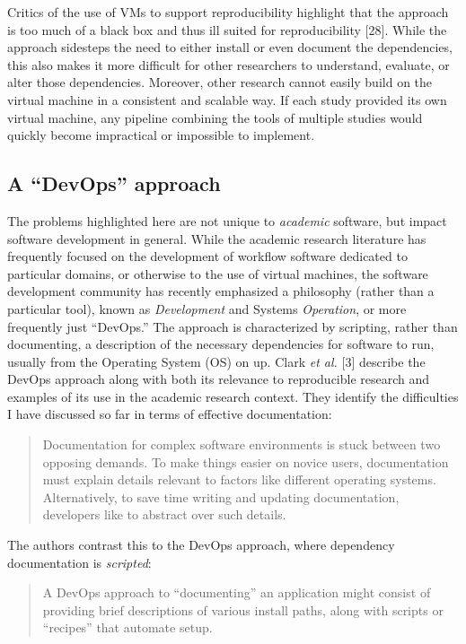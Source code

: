 \documentclass[9pt]{components/acm_proc_article-sp}
\begin{document}
Critics of the use of VMs to support reproducibility highlight that the
approach is too much of a black box and thus ill suited for
reproducibility {[}28{]}. While the approach sidesteps the need to
either install or even document the dependencies, this also makes it
more difficult for other researchers to understand, evaluate, or alter
those dependencies. Moreover, other research cannot easily build on the
virtual machine in a consistent and scalable way. If each study provided
its own virtual machine, any pipeline combining the tools of multiple
studies would quickly become impractical or impossible to implement.

\subsection{A ``DevOps'' approach}\label{a-devops-approach}

The problems highlighted here are not unique to \emph{academic}
software, but impact software development in general. While the academic
research literature has frequently focused on the development of
workflow software dedicated to particular domains, or otherwise to the
use of virtual machines, the software development community has recently
emphasized a philosophy (rather than a particular tool), known as
\emph{Development} and Systems \emph{Operation}, or more frequently just
``DevOps.'' The approach is characterized by scripting, rather than
documenting, a description of the necessary dependencies for software to
run, usually from the Operating System (OS) on up. Clark \emph{et al.}
{[}3{]} describe the DevOps approach along with both its relevance to
reproducible research and examples of its use in the academic research
context. They identify the difficulties I have discussed so far in terms
of effective documentation:

\begin{quote}
Documentation for complex software environments is stuck between two
opposing demands. To make things easier on novice users, documentation
must explain details relevant to factors like different operating
systems. Alternatively, to save time writing and updating documentation,
developers like to abstract over such details.
\end{quote}

The authors contrast this to the DevOps approach, where dependency
documentation is \emph{scripted}:

\begin{quote}
A DevOps approach to ``documenting'' an application might consist of
providing brief descriptions of various install paths, along with
scripts or ``recipes'' that automate setup.
\end{quote}
\end{document}
